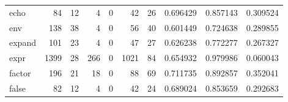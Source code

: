 \begin{longtable}{lrrrrrrrrr}
echo      &                                                 84 &                                                 12 &                                                  4 &                                                  0 &                                                 42 &                                                 26 &                                           0.696429 &                               0.857143 &                             0.309524 \\
env       &                                                138 &                                                 38 &                                                  4 &                                                  0 &                                                 56 &                                                 40 &                                           0.601449 &                               0.724638 &                             0.289855 \\
expand    &                                                101 &                                                 23 &                                                  4 &                                                  0 &                                                 47 &                                                 27 &                                           0.626238 &                               0.772277 &                             0.267327 \\
expr      &                                               1399 &                                                 28 &                                                266 &                                                  0 &                                               1021 &                                                 84 &                                           0.654932 &                               0.979986 &                             0.060043 \\
factor    &                                                196 &                                                 21 &                                                 18 &                                                  0 &                                                 88 &                                                 69 &                                           0.711735 &                               0.892857 &                             0.352041 \\
false     &                                                 82 &                                                 12 &                                                  4 &                                                  0 &                                                 42 &                                                 24 &                                           0.689024 &                               0.853659 &                             0.292683 \\

\end{longtable}
